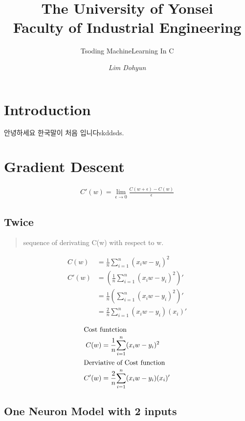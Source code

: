 \documentclass{article}
\title{\textbf{The University of Yonsei
\\{\Large Faculty of Industrial Engineering}}}
\subtitle{Tsoding MachineLearning In C}
\author{\emph{Lim Dohyun}}
\begin{document}
\maketitle
\section{Introduction}
안녕하세요 한국말이 처음 입니다skddsds.

\section{Gradient Descent}

\begin{align}
    C'(w) = \lim_{\epsilon \to 0}\frac{C(w + \epsilon) -C(w)}{\epsilon}
\end{align}

\subsection{Twice}
\begin{verse}
    sequence of derivating C(w) with respect to w.
\end{verse}
\begin{align}
   C(w) &= \frac{1}{n}{\sum_{i=1}^{n}(x_iw - y_i)^2} \\
   C'(w) &= \left(\frac{1}{n}{\sum_{i=1}^{n}(x_iw - y_i)^2}\right)' \\
   &= \frac{1}{n}\left({\sum_{i=1}^{n}(x_iw - y_i)^2}\right)' \\
   &= \frac{2}{n}{\sum_{i=1}^{n}(x_iw - y_i)(x_i)'}
\end{align}

\begin{align}
    \shortintertext{Cost funtction}
    C(w) &= \frac{1}{n}{\sum_{i=1}^{n}(x_iw - y_i)^2} \\
    \shortintertext{Derviative of Cost function}
    C'(w) &= \frac{2}{n}{\sum_{i=1}^{n}(x_iw - y_i)(x_i)'}
\end{align} 

    \bigskip

\subsection{One Neuron Model with 2 inputs}

\def\d{1.5}

\begin{center}
\end{center}
\end{document}
